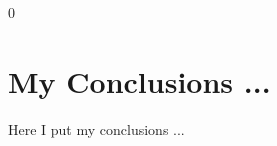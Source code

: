 0\def\baselinestretch{1}
\chapter{My Conclusions ...}
\ifpdf
    \graphicspath{{Conclusions/ConclusionsFigs/PNG/}{Conclusions/ConclusionsFigs/PDF/}{Conclusions/ConclusionsFigs/}}
\else
    \graphicspath{{Conclusions/ConclusionsFigs/EPS/}{Conclusions/ConclusionsFigs/}}
\fi

\def\baselinestretch{1.66}

Here I put my conclusions ...



